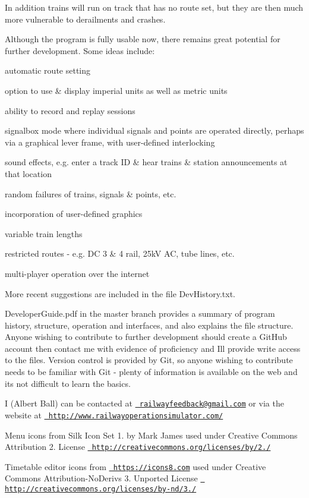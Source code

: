 In addition trains will run on track that has no route set, but they are then much more vulnerable to derailments and crashes.

Although the program is fully usable now, there remains great potential for further development. Some ideas include\+:


\begin{DoxyItemize}
\item automatic route setting
\item option to use \& display imperial units as well as metric units
\item ability to record and replay sessions
\item signalbox mode where individual signals and points are operated directly, perhaps via a graphical lever frame, with user-\/defined interlocking
\item sound effects, e.\+g. enter a track ID \& hear trains \& station announcements at that location
\item random failures of trains, signals \& points, etc.
\item incorporation of user-\/defined graphics
\item variable train lengths
\item restricted routes -\/ e.\+g. DC 3 \& 4 rail, 25kV AC, tube lines, etc.
\item multi-\/player operation over the internet
\end{DoxyItemize}

More recent suggestions are included in the file Dev\+History.\+txt.

\textquotesingle{}Developer\+Guide.\+pdf\textquotesingle{} in the \textquotesingle{}master\textquotesingle{} branch provides a summary of program history, structure, operation and interfaces, and also explains the file structure. Anyone wishing to contribute to further development should create a Git\+Hub account then contact me with evidence of proficiency and I\textquotesingle{}ll provide write access to the files. Version control is provided by \textquotesingle{}Git\textquotesingle{}, so anyone wishing to contribute needs to be familiar with \textquotesingle{}Git\textquotesingle{} -\/ plenty of information is available on the web and it\textquotesingle{}s not difficult to learn the basics.

I (Albert Ball) can be contacted at \href{mailto:railwayfeedback@gmail.com}{\texttt{ railwayfeedback@gmail.\+com}} or via the website at \href{http://www.railwayoperationsimulator.com/}{\texttt{ http\+://www.\+railwayoperationsimulator.\+com/}}

Menu icons from Silk Icon Set 1. by Mark James used under Creative Commons Attribution 2. License \href{http://creativecommons.org/licenses/by/2.5/}{\texttt{ http\+://creativecommons.\+org/licenses/by/2./}}

Timetable editor icons from \href{https://icons8.com}{\texttt{ https\+://icons8.\+com}} used under Creative Commons Attribution-\/\+No\+Derivs 3. Unported License \href{http://creativecommons.org/licenses/by-nd/3.0/}{\texttt{ http\+://creativecommons.\+org/licenses/by-\/nd/3./}} 